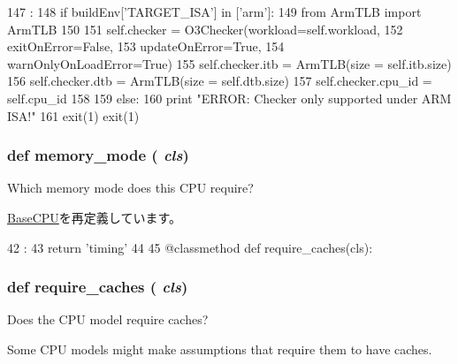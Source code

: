 \begin{DoxyCode}
147                            :
148         if buildEnv['TARGET_ISA'] in ['arm']:
149             from ArmTLB import ArmTLB
150 
151             self.checker = O3Checker(workload=self.workload,
152                                      exitOnError=False,
153                                      updateOnError=True,
154                                      warnOnlyOnLoadError=True)
155             self.checker.itb = ArmTLB(size = self.itb.size)
156             self.checker.dtb = ArmTLB(size = self.dtb.size)
157             self.checker.cpu_id = self.cpu_id
158 
159         else:
160             print "ERROR: Checker only supported under ARM ISA!"
161             exit(1)
            exit(1)
\end{DoxyCode}
\hypertarget{classO3CPU_1_1DerivO3CPU_a53d73a2f804df6a1dcabb22052d09773}{
\subsubsection[{memory\_\-mode}]{\setlength{\rightskip}{0pt plus 5cm}def memory\_\-mode ( {\em cls})}}
\label{classO3CPU_1_1DerivO3CPU_a53d73a2f804df6a1dcabb22052d09773}
\begin{DoxyVerb}Which memory mode does this CPU require?\end{DoxyVerb}
 

\hyperlink{classBaseCPU_1_1BaseCPU_a53d73a2f804df6a1dcabb22052d09773}{BaseCPU}を再定義しています。


\begin{DoxyCode}
42                         :
43         return 'timing'
44 
45     @classmethod
    def require_caches(cls):
\end{DoxyCode}
\hypertarget{classO3CPU_1_1DerivO3CPU_afcb2c5440cbf782e304bdb958eadf744}{
\subsubsection[{require\_\-caches}]{\setlength{\rightskip}{0pt plus 5cm}def require\_\-caches ( {\em cls})}}
\label{classO3CPU_1_1DerivO3CPU_afcb2c5440cbf782e304bdb958eadf744}
\begin{DoxyVerb}Does the CPU model require caches?

Some CPU models might make assumptions that require them to
have caches.
\end{DoxyVerb}
 

